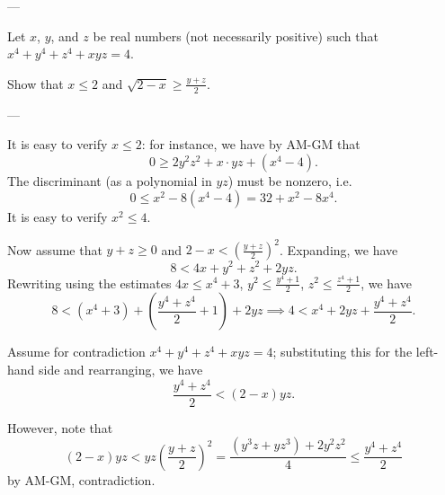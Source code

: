 
---

Let $x$, $y$, and $z$ be real numbers (not necessarily positive) such that $x^4+y^4+z^4+xyz=4$.

Show that $x\le2$ and $\sqrt{2-x}\ge\frac{y+z}{2}$.

---

It is easy to verify $x\le2$: for instance, we have by AM-GM that
\[0\ge2y^2z^2+x\cdot yz+\left(x^4-4\right).\]
The discriminant (as a polynomial in $yz$) must be nonzero, i.e.
\[0\le x^2-8\left(x^4-4\right)=32+x^2-8x^4.\]
It is easy to verify $x^2\le4$.

Now assume that $y+z\ge0$ and $2-x<\left(\frac{y+z}2\right)^2$. Expanding, we have
\[8<4x+y^2+z^2+2yz.\]
Rewriting using the estimates $4x\le x^4+3$, $y^2\le\frac{y^4+1}2$, $z^2\le\frac{z^4+1}2$, we have
\[8<\left(x^4+3\right)+\left(\frac{y^4+z^4}2+1\right)+2yz\implies4<x^4+2yz+\frac{y^4+z^4}2.\]

Assume for contradiction $x^4+y^4+z^4+xyz=4$; substituting this for the left-hand side and rearranging, we have
\[\frac{y^4+z^4}2<(2-x)yz.\]

However, note that
\[(2-x)yz<yz\left(\frac{y+z}2\right)^2=\frac{\left(y^3z+yz^3\right)+2y^2z^2}4\le\frac{y^4+z^4}2\]
by AM-GM, contradiction.
